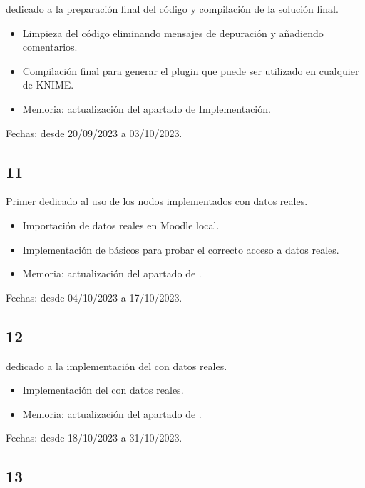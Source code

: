  dedicado a la preparación final del código y compilación de la solución final. 

\begin{itemize}
	\item Limpieza del código eliminando mensajes de depuración y añadiendo comentarios.
	\item Compilación final para generar el plugin que puede ser utilizado en cualquier  de KNIME. 
	\item Memoria: actualización del apartado de Implementación. 
\end{itemize}

Fechas: desde 20/09/2023 a 03/10/2023.

\subsection{ 11}

Primer  dedicado al uso de los nodos implementados con datos reales. 

\begin{itemize}
	\item Importación de datos reales en Moodle local. 
	\item Implementación de  básicos para probar el correcto acceso a datos reales. 
	\item Memoria: actualización del apartado de . 
\end{itemize}

Fechas: desde 04/10/2023 a 17/10/2023.


\subsection{ 12}

 dedicado a la implementación del  con datos reales. 

\begin{itemize}
	\item Implementación del  con datos reales. 
	\item Memoria: actualización del apartado de . 
\end{itemize}

Fechas: desde 18/10/2023 a 31/10/2023.

\subsection{ 13}

